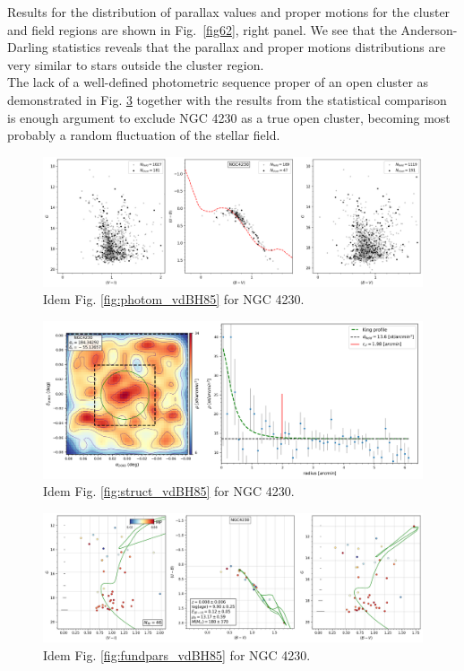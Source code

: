 \documentclass[draft]{aa}
\begin{document}
Results for the distribution of parallax values and proper motions for the
cluster and field regions are shown in Fig.~\ref{fig62}, right panel.
We see that the Anderson-Darling statistics reveals that the parallax and
proper motions distributions are very similar to stars outside the
cluster region.\\

The lack of a well-defined photometric sequence proper of an open cluster as
demonstrated in Fig. \ref{fig61} together with the results from
the statistical comparison is enough argument to exclude NGC 4230 as a true open
cluster, becoming most probably a random fluctuation of the stellar field.

\begin{figure}[ht]
    \centering
    \includegraphics[width=\hsize]{../figs/obs_NGC4230.png}
    \caption{Idem Fig. \ref{fig:photom_vdBH85} for NGC 4230.}
    \label{fig59}
\end{figure}
\begin{figure}[ht]
    \centering
    \includegraphics[width=\hsize]{../figs/dmap_ngc4230.png}
    \caption{Idem Fig. \ref{fig:struct_vdBH85} for NGC 4230.}
    \label{fig60}
\end{figure}
\begin{figure}[ht]
    \centering
    \includegraphics[width=\hsize]{../figs/cmds_ngc4230.png}
    \caption{Idem Fig. \ref{fig:fundpars_vdBH85} for NGC 4230.}
    \label{fig61}
\end{figure}
\end{document}
